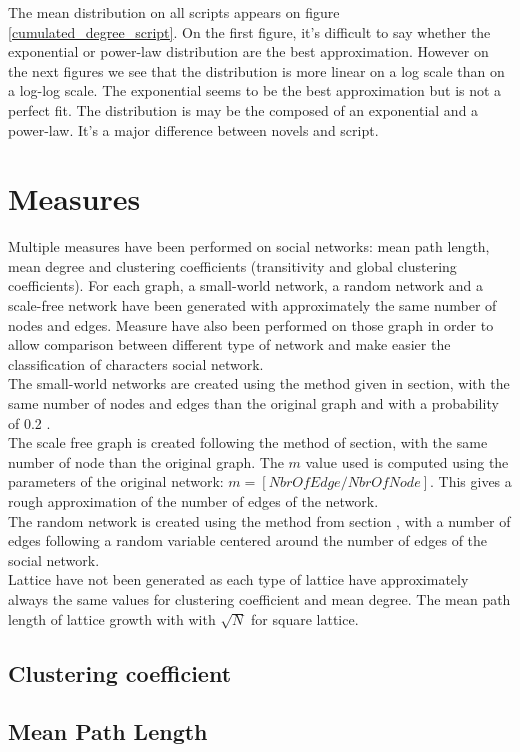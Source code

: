 \documentclass[a4paper, 12pt]{report}
\begin{document}
The mean distribution on all scripts appears on figure \ref{cumulated_degree_script}. On the first figure, it's difficult to say whether the exponential or power-law distribution are the best approximation. However on the next figures we see that the distribution is more linear on a log scale than on a log-log scale. The exponential seems to be the best approximation but is not a perfect fit. The distribution is may be the composed of an exponential and a power-law. It's a major difference between novels and script.


\section{Measures}
Multiple measures have been performed on social networks: mean path length, mean degree and clustering coefficients (transitivity and global clustering coefficients). For each graph, a small-world network, a random network and a scale-free network have been generated with approximately the same number of nodes and edges. Measure have also been performed on those graph in order to allow comparison between different type of network and make easier the classification of characters social network.\\

The small-world networks are created using the method given in section, with the same number of nodes and edges than the original graph and with a probability of 0.2 .\\
The scale free graph is created following the method of section, with the same number of node than the original graph. The $m$ value used is computed using the parameters of the original network: $m = [NbrOfEdge / NbrOfNode]$. This gives a rough approximation of the number of edges of the network.\\

The random network is created using the method from section , with a number of edges following a random variable centered around the number of edges of the social network.\\
Lattice have not been generated as each type of lattice have approximately always the same values for clustering coefficient and mean degree. The mean path length of lattice growth with with $\sqrt{N}$ for square lattice.

\subsection{Clustering coefficient}

\subsection{Mean Path Length}

\listoffigures

\listoftables

 
\end{document}
